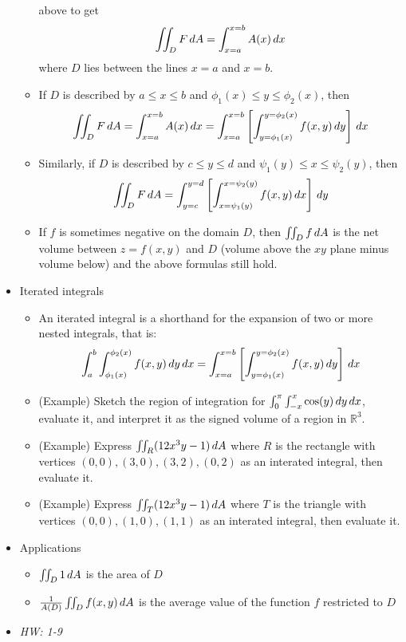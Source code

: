 \documentclass[11pt]{article}
\begin{document}
\begin{itemize}
\begin{itemize}
      above to get
        \[
          \iint_D F\,d A
            =
          \int_{x=a}^{x=b}
          A(x)
          \,d x
        \]
      where \(D\) lies between the lines \(x=a\) and \(x=b\).
      \item If \(D\) is described by \(a\leq x\leq b\) and
        \(\phi_1(x)\leq y\leq \phi_2(x)\), then
        \[
          \iint_D F\,d A
            =
          \int_{x=a}^{x=b}
          A(x)
          \,d x
            =
          \int_{x=a}^{x=b}
          \left[
          \int_{y=\phi_1(x)}^{y=\phi_2(x)}
          f(x,y) \,d y
          \right] \,d x
        \]
      \item Similarly, if \(D\) is described by \(c\leq y\leq d\) and
        \(\psi_1(y)\leq x\leq \psi_2(y)\), then
        \[
          \iint_D F\,d A
            =
          \int_{y=c}^{y=d}
          \left[
          \int_{x=\psi_1(y)}^{x=\psi_2(y)}
          f(x,y) \,d x
          \right] \,d y
        \]
      \item If \(f\) is sometimes negative on the domain \(D\), then
        \(\iint_D f\,d A\) is the net volume between \(z=f(x,y)\)
        and \(D\) (volume above the
        \(xy\) plane minus volume below) and the above formulas still hold.
    \end{itemize}
  \item Iterated integrals
    \begin{itemize}
      \item An iterated integral is a shorthand for the expansion of two
        or more nested integrals, that is:
        \[
          \int_a^b
          \int_{\phi_1(x)}^{\phi_2(x)}
          f(x,y)
          \,d y\,d x
            =
          \int_{x=a}^{x=b}
          \left[
          \int_{y=\phi_1(x)}^{y=\phi_2(x)}
          f(x,y) \,d y
          \right] \,d x
        \]
      \item (Example) Sketch the region of integration for
            \(\int_0^\pi\int_{-x}^x \cos(y)\,d y\,d x\),
            evaluate it,
            and interpret it as the signed volume of a region in \(\mathbb R^3\).
      \item (Example) Express \(\iint_R (12x^3y-1)\,d A\) where
            \(R\) is the
            rectangle with vertices \((0,0),(3,0),(3,2),(0,2)\)
            as an interated integral, then evaluate it.
      \item (Example) Express \(\iint_T (12x^3y-1)\,d A\) where
            \(T\) is the
            triangle with vertices \((0,0),(1,0),(1,1)\)
            as an interated integral, then evaluate it.
    \end{itemize}
  \item Applications
    \begin{itemize}
      \item \(\iint_D 1\,d A\) is the area of \(D\)
      \item \(\frac{1}{A(D)}\iint_D f(x,y)\,d A\) is the average value
            of the function \(f\) restricted to \(D\)
    \end{itemize}
  \item\textit{
    HW: 1-9
  }
\end{itemize}
\end{document}
